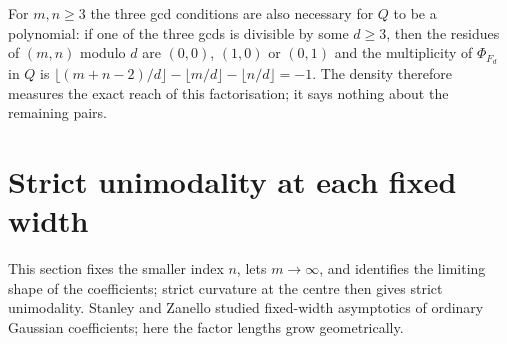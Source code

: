\documentclass[11pt,a4paper]{article}
\theoremstyle{definition}\newtheorem{definition}[theorem]{Definition}
\theoremstyle{remark}\newtheorem{remark}[theorem]{Remark}\newtheorem{example}[theorem]{Example}
\numberwithin{equation}{section}
\begin{document}
For $m,n\ge3$ the three gcd conditions are also necessary for $Q$ to be a polynomial: if one of the three gcds is divisible by some $d\ge3$, then the residues of $(m,n)$ modulo $d$ are $(0,0)$, $(1,0)$ or $(0,1)$ and the multiplicity of $\Phi_{F_d}$ in $Q$ is $\lfloor(m+n-2)/d\rfloor-\lfloor m/d\rfloor-\lfloor n/d\rfloor=-1$. The density therefore measures the exact reach of this factorisation; it says nothing about the remaining pairs.

\section{Strict unimodality at each fixed width}\label{sec:fixed}
This section fixes the smaller index $n$, lets $m\to\infty$, and identifies the limiting shape of the coefficients; strict curvature at the centre then gives strict unimodality. Stanley and Zanello \cite{sz} studied fixed-width asymptotics of ordinary Gaussian coefficients; here the factor lengths grow geometrically.
\end{document}
